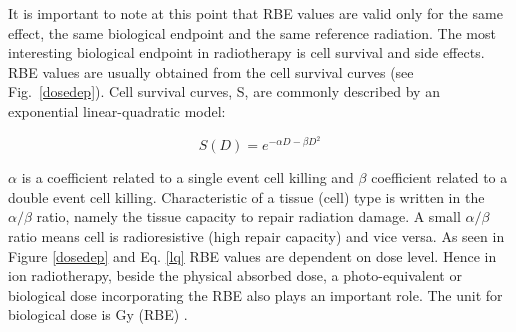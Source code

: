 \documentclass[type=dr, dr=rernat, accentcolor=tud7b,colorbacktitle, bigchapter, openright, twoside, 12pt ]{tudthesis}
\begin{document}
It is important to note at this point that RBE values are valid only for the same effect, the same biological endpoint and the same reference radiation. The most interesting biological endpoint in radiotherapy is cell survival and
side effects. RBE values are usually obtained from the cell survival curves (see Fig.~\ref{dosedep}). Cell survival curves, S, are commonly described by an exponential linear-quadratic model:

\begin{equation}
 S(D) = e^{-\alpha D - \beta D^2}
 \label{lq}
\end{equation}

$\alpha$ is a coefficient related to a single event cell killing and $\beta$ coefficient related to a double event cell killing. Characteristic  of a tissue (cell) type is written in the $\alpha / \beta$ ratio, namely the tissue 
capacity to repair radiation damage. A small $\alpha / \beta$ ratio means cell is radioresistive (high repair capacity) and vice versa.
As seen in Figure \ref{dosedep} and Eq. \ref{lq} RBE values are dependent on dose level. Hence in ion radiotherapy, beside the physical absorbed dose, a photo-equivalent or biological dose incorporating the RBE also plays an important role. 
The unit for biological dose is Gy (RBE) \cite{ICRU2007}. 
\end{document}
